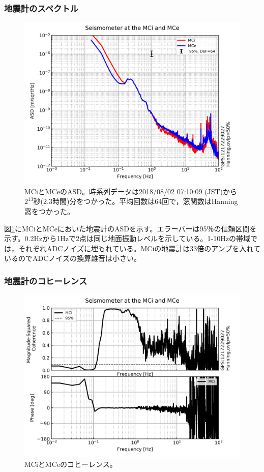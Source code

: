 \subsubsection{地震計のスペクトル}

\begin{figure}[H]
  \begin{center}
    \includegraphics[width=11.5cm]{./ASD-MCi_MCe.png}
  \end{center}
  \caption{MCiとMCeのASD。時系列データは2018/08/02 07:10:09 (JST)から$2^{13}$秒(2.3時間)分をつかった。平均回数は64回で，窓関数はHanning窓をつかった。}\label{img:img_asd_imc}
\end{figure}

図\ref{img:img_asd_imc}にMCiとMCeにおいた地震計のASDを示す。エラーバーは95％の信頼区間を示す。0.2Hzから1Hzで2点は同じ地面振動レベルを示している。1-10Hzの帯域では，それぞれADCノイズに埋もれている。MCiの地震計は33倍のアンプを入れているのでADCノイズの換算雑音は小さい。


\subsubsection{地震計のコヒーレンス}

\begin{figure}[H]
  \begin{center}
    \includegraphics[width=11.5cm]{./Coherence-MCi_MCe.png}
  \end{center}
  \caption{MCiとMCeのコヒーレンス。}\label{img:img_coherence_imc}
\end{figure}

